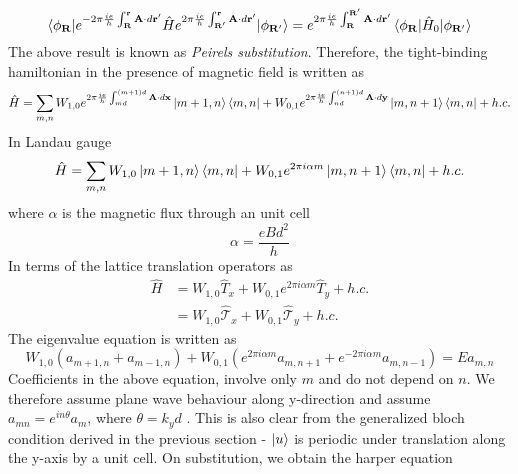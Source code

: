 \begin{equation}
 \braket{\phi_{\mathbf{R}}|e^{-2\pi \frac{ie}{h}\int_{\mathbf{R}}^{\mathbf{r}}{\mathbf{A}\cdot d\mathbf{r}'}}\hat{H}e^{2\pi \frac{ie}{h}\int_{\mathbf{R}'}^{\mathbf{r}}{\mathbf{A}\cdot d\mathbf{r}'}}|\phi_{\mathbf{R}'}} = e^{2\pi \frac{ie}{h}\int_{\mathbf{R}}^{\mathbf{R}'}{\mathbf{A}\cdot d\mathbf{r}'}} \braket{\phi_{\mathbf{R}}|\hat{H}_{0}|\phi_{\mathbf{R}'}}
\end{equation} The above result is known as \emph{Peirels substitution}. Therefore, the tight-binding hamiltonian in the presence of magnetic field is written as \cite{hofstadter1976energy,bernevig2013topological,fischbeck1970theory}
\begin{equation}
 \hat{H} = \sum_{m, n} W_{1,0}e^{2\pi \frac{ie}{h}\int_{md}^{(m+1)d}{\mathbf{A}\cdot d\mathbf{x}}}\ket{m+1, n}\bra{m, n} + W_{0,1}e^{2\pi \frac{ie}{h}\int_{nd}^{(n+1)d}{\mathbf{A}\cdot d\mathbf{y}}}\ket{m, n+1}\bra{m, n} + h.c.
\end{equation}
In Landau gauge
\begin{equation}
 \label{chap_6:harperprev}\hat{H} = \sum_{m, n} W_{1,0}\ket{m+1, n}\bra{m, n} + W_{0,1}e^{2\pi i \alpha m}\ket{m, n+1}\bra{m, n} + h.c.
\end{equation} where $\alpha$ is the magnetic flux through an unit cell
\begin{equation}
 \alpha = \frac{eBd^2}{h}
\end{equation}
In terms of the lattice translation operators as
\begin{align}
 \hat{H} &= W_{1,0}\hat{T}_{x} + W_{0,1}e^{2\pi i \alpha m}\hat{T}_{y} + h.c. \\
 &= W_{1,0}\hat{\mathcal{T}}_{x} + W_{0,1}\hat{\mathcal{T}}_{y} + h.c.
\end{align}
The eigenvalue equation is written as
\begin{equation}
 W_{1,0}(a_{m+1, n} + a_{m-1, n}) + W_{0, 1}(e^{2\pi i \alpha m}a_{m, n+1} + e^{-2\pi i \alpha m}a_{m, n-1}) = Ea_{m, n}
\end{equation}
Coefficients in the above equation, involve only $m$ and do not depend on $n$. We therefore assume plane wave behaviour along y-direction and assume
$a_{mn} = e^{in\theta}a_m$, where $\theta = k_y d$ \cite{hofstadter1976energy,stockmann2006quantum}. This is also clear from the generalized bloch condition derived in the previous section - $\ket{u}$ is periodic 
under translation along the y-axis by a unit cell. On substitution, we obtain the harper equation \cite{harper1955general,harper1955single,hofstadter1976energy,stockmann2006quantum}
